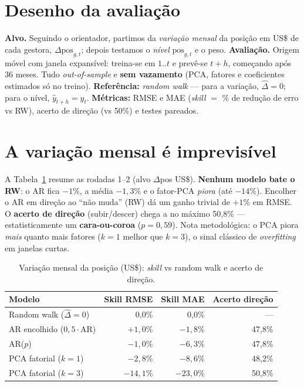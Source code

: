 \documentclass[12pt,a4paper]{article}
\begin{document}
\section{Desenho da avaliação}\label{sec:setup}
\textbf{Alvo.} Seguindo o orientador, partimos da \emph{variação mensal} da posição em US\$ de cada gestora,
$\Delta\text{pos}_{g,t}$; depois testamos o \emph{nível} $\text{pos}_{g,t}$ e o peso.
\textbf{Avaliação.} Origem móvel com janela expansível: treina-se em $1..t$ e prevê-se $t{+}h$, começando após
36 meses. Tudo \emph{out-of-sample} e \textbf{sem vazamento} (PCA, fatores e coeficientes estimados só no
treino). \textbf{Referência:} \emph{random walk} --- para a variação, $\widehat{\Delta}=0$; para o nível,
$\widehat{y}_{t+h}=y_t$. \textbf{Métricas:} RMSE e MAE (\emph{skill} $=$ \% de redução de erro vs RW), acerto
de direção (vs 50\%) e testes pareados.

\section{A variação mensal é imprevisível}\label{sec:var}
A Tabela~\ref{tab:r12} resume as rodadas 1--2 (alvo $\Delta$pos US\$). \textbf{Nenhum modelo bate o RW}: o AR
fica $-1\%$, a média $-1{,}3\%$ e o fator-PCA \emph{piora} (até $-14\%$). Encolher o AR em direção ao ``não
muda'' (RW) dá um ganho trivial de $+1\%$ em RMSE. O \textbf{acerto de direção} (subir/descer) chega a no
máximo 50,8\% --- estatisticamente um \textbf{cara-ou-coroa} ($p=0{,}59$). Nota metodológica: o PCA piora
\emph{mais} quanto mais fatores ($k{=}1$ melhor que $k{=}3$), o sinal clássico de \emph{overfitting} em
janelas curtas.

\begin{table}[H]\centering
\caption{Variação mensal da posição (US\$): \emph{skill} vs random walk e acerto de direção.}
\label{tab:r12}
\small
\begin{tabular}{lrrr}
\toprule
\textbf{Modelo} & \textbf{Skill RMSE} & \textbf{Skill MAE} & \textbf{Acerto direção} \\
\midrule
Random walk ($\widehat{\Delta}=0$) & 0,0\%  & 0,0\%   & --- \\
AR encolhido ($0{,}5\cdot$AR)       & $+1{,}0\%$ & $-1{,}8\%$ & 47,8\% \\
AR($p$)                             & $-1{,}0\%$ & $-6{,}3\%$ & 47,8\% \\
PCA fatorial ($k{=}1$)              & $-2{,}8\%$ & $-8{,}6\%$ & 48,2\% \\
PCA fatorial ($k{=}3$)              & $-14{,}1\%$ & $-23{,}0\%$ & 50,8\% \\
\bottomrule
\end{tabular}
\end{table}
\end{document}
